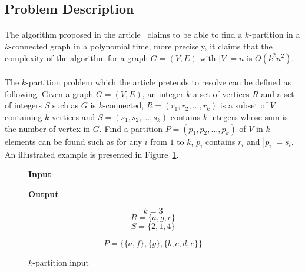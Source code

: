 \subsection{Problem Description}
\paragraph{}
The algorithm proposed in the article~\cite{JS94} claims to be able to find
a $k$-partition in a $k$-connected graph in a polynomial time, more precisely,
it claims that the complexity of the algorithm for a graph $G = (V,E)$ with
$|V| = n$ is $O(k^2 n^2)$.

\paragraph{}
The $k$-partition problem which the article pretends to resolve can be
defined as following. Given a graph $G = (V,E)$, an integer $k$ a set
of vertices $R$ and a set of integers $S$ such as $G$ is $k$-connected,
$R = (r_1, r_2, \dots, r_k )$ is a subset of $V$ containing $k$ vertices and
$S = (s_1, s_2, \dots, s_k )$ contains $k$ integers whose sum is the number of
vertex in $G$. Find a partition $P = (p_1, p_2, \dots, p_k)$ of $V$ in $k$
elements can be found such as for any $i$ from $1$ to $k$, $p_i$ contains
$r_i$ and $|p_i| = s_i$. An illustrated example is presented in
Figure~\ref{fig:inputOutput}.

\newcommand{\formalTitle}[1]{\textbf{\large #1}}

\begin{figure}[H]
  \caption{\label{fig:inputOutput}$k$-partition input}
  \begin{minipage}{.5\textwidth}
    \begin{center}
      \formalTitle{Input}\\
      \begin{tikzpicture}[x=.06\textwidth, y=.06\textwidth,transform shape]
        
      \end{tikzpicture}
    \end{center}
  \end{minipage}
  \begin{minipage}{.5\textwidth}
    \begin{center}
      \formalTitle{Output}\\
      \begin{tikzpicture}[x=.06\textwidth, y=.06\textwidth,transform shape]
        
      \end{tikzpicture}
    \end{center}
  \end{minipage}
  \begin{minipage}{.5\textwidth}
    $$k = 3$$
    $$R = \{a,g,c\}$$
    $$S = \{2,1,4\}$$
  \end{minipage}
  \begin{minipage}{.5\textwidth}
    $$P = \big\{\{a, f\},\{g\},\{b, c, d, e\}\big\}$$
  \end{minipage}
\end{figure}

